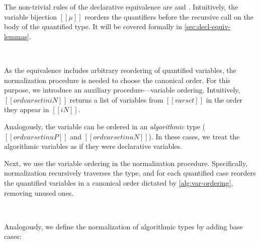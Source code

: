\documentclass[acmsmall,natbib=false,review,anonymous]{acmart}
\begin{document}
The non-trivial rules of the declarative equivalence are
 and .
Intuitively, the variable bijection $[[μ]]$ reorders the quantifiers before
the recursive call on the body of the quantified type. 
It will be covered formally in \cref{sec:decl-equiv-lemmas}.

\begin{definition}
  \hfill
  
  \begin{multicols}{2}
  \ottdefnEOneNeq{}
  \columnbreak\\
  \ottdefnEOnePeq{}
  \end{multicols}

\end{definition}

As the equivalence includes arbitrary reordering of quantified variables,
the normalization procedure is needed to choose the canonical order.
For this purpose, we introduce an auxiliary procedure---variable ordering. 
Intuitively, $[[ord varset in iN]]$ returns a list of variables from $[[varset]]$
in the order they appear in $[[iN]]$.

\begin{algorithm}
  \label{alg:var-ordering}
  \hfill
  
  \ottdefnONVar{}
  \ottdefnOPVar{}

  Analogously, the variable can be ordered in 
  an \emph{algorithmic} type ($[[ord varset in uP]]$ and 
  $[[ord varset in uN]]$). In these cases, we treat the algorithmic variables
  as if they were declarative variables.

\end{algorithm}

Next, we use the variable ordering in the normalization procedure. 
Specifically, normalization recursively traverses the type, 
and for each quantified case reorders the quantified variables in a 
canonical order dictated by \cref{alg:var-ordering}, removing unused ones.

\begin{algorithm}
  \label{alg:type-nf}
  \hfill
  
  \begin{multicols}{2}
  \ottdefnNrmNNorm{}
  \columnbreak\\
  \ottdefnNrmPNorm{}
  \end{multicols}

  Analogously, we define the normalization of algorithmic types by adding base cases:

  \begin{multicols}{2}
  \ottdefnNrmuNNorm{}
  \columnbreak\\
  \ottdefnNrmuPNorm{}
  \end{multicols}

\end{algorithm}
\end{document}
